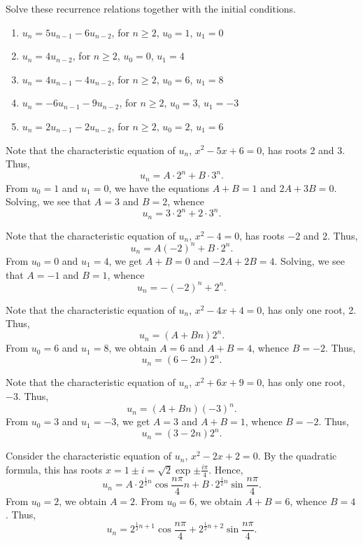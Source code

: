 \begin{problem}
    Solve these recurrence relations together with the initial conditions.
        
    \begin{enumerate}
        \item $u_n = 5u_{n-1} - 6u_{n-2}$, for $n \geq 2$, $u_0 = 1$, $u_1 = 0$
        \item $u_n = 4u_{n-2}$, for $n \geq 2$, $u_0 = 0$, $u_1 = 4$
        \item $u_n = 4u_{n-1} - 4u_{n-2}$, for $n \geq 2$, $u_0 = 6$, $u_1 = 8$
        \item $u_n = -6u_{n-1} - 9u_{n-2}$, for $n \geq 2$, $u_0 = 3$, $u_1 = -3$
        \item $u_n = 2u_{n-1} - 2u_{n-2}$, for $n \geq 2$, $u_0 = 2$, $u_1 = 6$
    \end{enumerate}
\end{problem}
\begin{solution}
    \begin{ppart}
        Note that the characteristic equation of $u_n$, $x^2 - 5x + 6 = 0$, has roots 2 and 3. Thus, \[u_n = A\cdot2^n + B\cdot3^n.\] From $u_0 = 1$ and $u_1 = 0$, we have the equations $A + B = 1$ and $2A + 3B = 0$. Solving, we see that $A = 3$ and $B = 2$, whence \[u_n = 3 \cdot 2^n + 2 \cdot 3^n.\]
    \end{ppart}
    \begin{ppart}
        Note that the characteristic equation of $u_n$, $x^2 - 4 = 0$, has roots $-2$ and 2. Thus, \[u_n = A(-2)^n + B\cdot2^n.\] From $u_0 = 0$ and $u_1 = 4$, we get $A + B = 0$ and $-2A + 2B = 4$. Solving, we see that $A = -1$ and $B = 1$, whence \[u_n = -(-2)^n + 2^n.\]
    \end{ppart}
    \begin{ppart}
        Note that the characteristic equation of $u_n$, $x^2 - 4x + 4 = 0$, has only one root, 2. Thus, \[u_n = (A + Bn)2^n.\] From $u_0 = 6$ and $u_1 = 8$, we obtain $A = 6$ and $A + B = 4$, whence $B = -2$. Thus, \[u_n = (6 - 2n)2^n.\]
    \end{ppart}
    \begin{ppart}
        Note that the characteristic equation of $u_n$, $x^2 + 6x + 9 = 0$, has only one root, $-3$. Thus, \[u_n = (A + Bn)(-3)^n.\] From $u_0 = 3$ and $u_1 = -3$, we get $A = 3$ and $A + B = 1$, whence $B = -2$. Thus, \[u_n = (3 - 2n)2^n.\]
    \end{ppart}
    \begin{ppart}
        Consider the characteristic equation of $u_n$, $x^2 - 2x + 2 = 0$. By the quadratic formula, this has roots $x = 1 \pm i = \sqrt{2} \exp{\pm \frac{i\pi}4}$. Hence, \[u_n = A \cdot 2^{\frac12 n} \cos{\frac{n\pi}4 n } + B \cdot 2^{\frac12 n} \sin{\frac{n\pi}4}.\] From $u_0 = 2$, we obtain $A = 2$. From $u_0 = 6$, we obtain $A + B = 6$, whence $B = 4$. Thus, \[u_n = 2^{\frac12 n + 1} \cos{\frac{n\pi}4} + 2^{\frac12 n + 2} \sin{\frac{n\pi}4}.\]
    \end{ppart}
\end{solution}

